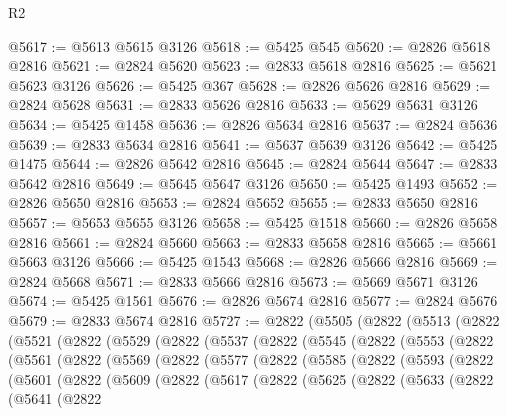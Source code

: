 \begin{lexlean}{R2}
\begin{coremodule}
@5617 := @5613 @5615 @3126
@5618 := @5425 @545
@5620 := @2826 @5618 @2816
@5621 := @2824 @5620
@5623 := @2833 @5618 @2816
@5625 := @5621 @5623 @3126
@5626 := @5425 @367
@5628 := @2826 @5626 @2816
@5629 := @2824 @5628
@5631 := @2833 @5626 @2816
@5633 := @5629 @5631 @3126
@5634 := @5425 @1458
@5636 := @2826 @5634 @2816
@5637 := @2824 @5636
@5639 := @2833 @5634 @2816
@5641 := @5637 @5639 @3126
@5642 := @5425 @1475
@5644 := @2826 @5642 @2816
@5645 := @2824 @5644
@5647 := @2833 @5642 @2816
@5649 := @5645 @5647 @3126
@5650 := @5425 @1493
@5652 := @2826 @5650 @2816
@5653 := @2824 @5652
@5655 := @2833 @5650 @2816
@5657 := @5653 @5655 @3126
@5658 := @5425 @1518
@5660 := @2826 @5658 @2816
@5661 := @2824 @5660
@5663 := @2833 @5658 @2816
@5665 := @5661 @5663 @3126
@5666 := @5425 @1543
@5668 := @2826 @5666 @2816
@5669 := @2824 @5668
@5671 := @2833 @5666 @2816
@5673 := @5669 @5671 @3126
@5674 := @5425 @1561
@5676 := @2826 @5674 @2816
@5677 := @2824 @5676
@5679 := @2833 @5674 @2816
@5727 := @2822
    (@5505
      (@2822
        (@5513
          (@2822
            (@5521
              (@2822
                (@5529
                  (@2822
                    (@5537
                      (@2822
                        (@5545
                          (@2822
                            (@5553
                              (@2822
                                (@5561
                                  (@2822
                                    (@5569
                                      (@2822
                                        (@5577
                                          (@2822
                                            (@5585
                                              (@2822
                                                (@5593
                                                  (@2822
                                                    (@5601
                                                      (@2822
                                                        (@5609
                                                          (@2822
                                                            (@5617
                                                              (@2822
                                                                (@5625
                                                                  (@2822
                                                                    (@5633
                                                                      (@2822
                                                                        (@5641
                                                                          (@2822

\end{coremodule}
\end{lexlean}
